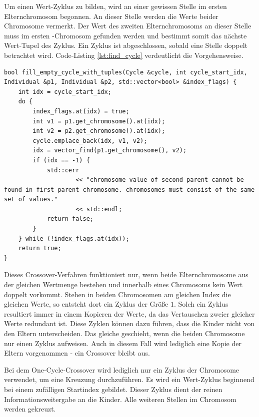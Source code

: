 Um einen Wert-Zyklus zu bilden, wird an einer gewissen Stelle im ersten Elternchromosom begonnen. An dieser Stelle werden die Werte beider Chromosome vermerkt. Der Wert des zweiten Elternchromosoms an dieser Stelle muss im ersten -Chromosom gefunden werden und bestimmt somit das nächste Wert-Tupel des Zyklus. Ein Zyklus ist abgeschlossen, sobald eine Stelle doppelt betrachtet wird. Code-Listing \ref{lst:find_cycle} verdeutlicht die Vorgehensweise.

\begin{minipage}{\linewidth}
\begin{lstlisting}[caption={Zyklus finden}, firstnumber=1, captionpos=b, label=lst:find_cycle]
bool fill_empty_cycle_with_tuples(Cycle &cycle, int cycle_start_idx, Individual &p1, Individual &p2, std::vector<bool> &index_flags) {
    int idx = cycle_start_idx;
    do {
        index_flags.at(idx) = true;
        int v1 = p1.get_chromosome().at(idx);
        int v2 = p2.get_chromosome().at(idx);
        cycle.emplace_back(idx, v1, v2);
        idx = vector_find(p1.get_chromosome(), v2);
        if (idx == -1) {
            std::cerr
                    << "chromosome value of second parent cannot be found in first parent chromosome. chromosomes must consist of the same set of values."
                    << std::endl;
            return false;
        }
    } while (!index_flags.at(idx));
    return true;
}
\end{lstlisting}
\end{minipage}

Dieses Crossover-Verfahren funktioniert nur, wenn beide Elternchromosome aus der gleichen Wertmenge bestehen und innerhalb eines Chromosoms kein Wert doppelt vorkommt.
Stehen in beiden Chromosomen am gleichen Index die gleichen Werte, so entsteht dort ein Zyklus der Größe $1$. Solch ein Zyklus resultiert immer in einem Kopieren der Werte, da das Vertauschen zweier gleicher Werte redundant ist. Diese Zyklen können dazu führen, dass die Kinder nicht von den Eltern unterscheiden.
Das gleiche geschieht, wenn die beiden Chromosome nur einen Zyklus aufweisen. Auch in diesem Fall wird lediglich eine Kopie der Eltern vorgenommen - ein Crossover bleibt aus.

Bei dem One-Cycle-Crossover wird lediglich nur ein Zyklus der Chromosome verwendet, um eine Kreuzung durchzuführen. Es wird ein Wert-Zyklus beginnend bei einem zufälligen Startindex gebildet. Dieser Zyklus dient der reinen Informationsweitergabe an die Kinder. Alle weiteren Stellen im Chromosom werden gekreuzt.

